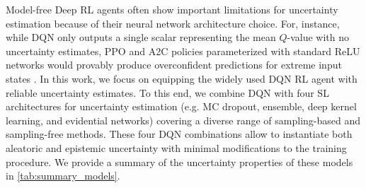 Model-free Deep RL agents often show important limitations for uncertainty estimation because of their neural network architecture choice. For, instance, while DQN only outputs a single scalar representing the mean $Q$-value with no uncertainty estimates, PPO and A2C policies parameterized with standard ReLU networks would provably produce overconfident predictions for extreme input states \citep{overconfident-relu}. In this work, we focus on equipping the widely used DQN RL agent with reliable uncertainty estimates. To this end, we combine DQN with four SL architectures for uncertainty estimation (e.g. MC dropout, ensemble, deep kernel learning, and evidential networks) covering a diverse range of sampling-based and sampling-free methods. These four DQN combinations allow to instantiate both aleatoric and epistemic uncertainty with minimal modifications to the training procedure.  We provide a summary of the uncertainty properties of these models in \cref{tab:summary_models}.

\begin{table*}[ht!]
    \vspace{-0mm}
	\caption{Summary of the uncertainty properties of the models.}
	\label{tab:summary_models}
	\vspace{-0mm}
	\centering
	\vspace{-0mm}
\end{table*}

